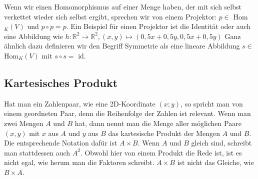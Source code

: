 \documentclass[12pt]{article}
\begin{document}
				\noindent Wenn wir einen Homomorphismus auf einer Menge haben, der mit sich selbst verkettet wieder sich selbst ergibt, sprechen wir von einem Projektor: $p\in$ Hom$_K(V)$ und $p\circ p =p$. Ein Beispiel für einen Projektor ist die Identität oder auch eine Abbildung wie $h:\mathbb{R}^2\to\mathbb{R}^2,(x,y)\mapsto (0,5x+0,5y,0,5x+0,5y)$\newline\newline
				Ganz ähnlich dazu definieren wir den Begriff Symmetrie als eine lineare Abbildung $s\in$ Hom$_K(V)$ mit $s\circ s=$ id.
	\subsection{Kartesisches Produkt}
		Hat man ein Zahlenpaar, wie eine 2D-Koordinate $(x;y)$, so spricht man von einem geordneten Paar, denn die Reihenfolge der Zahlen ist relevant. Wenn man zwei Mengen $A$ und $B$ hat, dann nennt man die Menge aller möglichen Paare $(x,y)$ mit $x$ aus $A$ und $y$ aus $B$ das kartesische Produkt der Mengen $A$ und $B$. Die entsprechende Notation dafür ist $A\times B$. Wenn $A$ und $B$ gleich sind, schreibt man stattdessen auch $A^2$. Obwohl hier von einem Produkt die Rede ist, ist es nicht egal, wie herum man die Faktoren schreibt. $A\times B$ ist nicht das Gleiche, wie $B\times A$.
\end{document}
